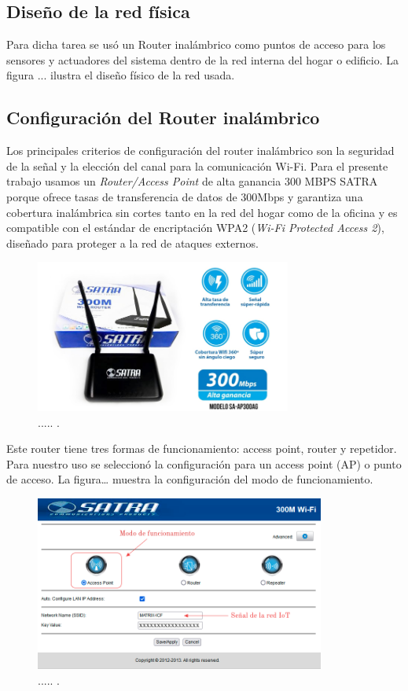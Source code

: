 \subsection{Diseño de la red física}

Para dicha tarea se usó un Router inalámbrico como puntos de acceso para los sensores y actuadores del sistema dentro de la red interna del hogar o edificio. La figura ... ilustra el diseño físico de la red usada.


\subsection{Configuración del Router inalámbrico}
Los principales criterios de configuración del router inalámbrico son la seguridad de la señal y la elección del canal para la comunicación Wi-Fi. Para el presente trabajo usamos un \emph{Router/Access Point} de alta ganancia 300 MBPS SATRA porque ofrece tasas de transferencia de datos de 300Mbps y garantiza una cobertura inalámbrica sin cortes tanto en la red del hogar como de la oficina y es compatible con el estándar de encriptación WPA2 (\emph{Wi-Fi Protected Access 2}), diseñado para proteger a la red de ataques externos. 

\begin{figure}[htpb]
\centering 
\includegraphics[width=0.75\textwidth]{./Figures/router.jpg}
\caption{..... .}
\label{fig:router}
\end{figure}

Este router tiene tres formas de funcionamiento: access point, router y repetidor. Para nuestro uso se seleccionó la configuración para un access point (AP) o punto de acceso. La figura… muestra la configuración del modo de funcionamiento.

\begin{figure}[htpb]
\centering 
\includegraphics[width=0.85\textwidth]{./Figures/funcionamientorouter.png}
\caption{..... .}
\label{fig:funcionamientorouter}
\end{figure}

